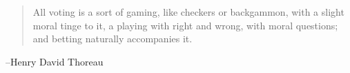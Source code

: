 \documentclass[letterpaper, landscape]{exam}
\begin{document}
  \else
    \vspace{11 cm}
    \begin{quote}
      \begin{em}
        All voting is a sort of gaming, like checkers or backgammon, with a
        slight moral tinge to it, a playing with right and wrong, with moral
        questions; and betting naturally accompanies it. 

      \end{em}
    \end{quote}
    \hspace{1 cm} --Henry David Thoreau
  \fi
\end{document}
